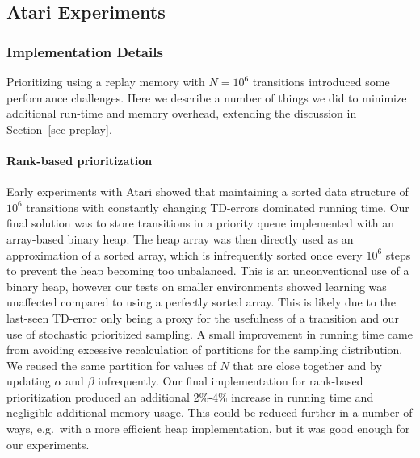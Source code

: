 \documentclass[a4paper]{article}
\begin{document}
\subsection{Atari Experiments}
\label{app-atari-experiments}


\subsubsection{Implementation Details}
\label{app-atari-experiments-impl-details}

Prioritizing using a replay memory with $N=10^6$ transitions introduced some performance challenges.  Here we describe a number of things we did to minimize additional run-time and memory overhead, extending the discussion in Section~\ref{sec-preplay}.

\paragraph{Rank-based prioritization} Early experiments with Atari showed that maintaining a sorted data structure of $10^6$ transitions with constantly changing TD-errors dominated running time.  Our final solution  was to store transitions in a priority queue implemented with an array-based binary heap.  The heap array was then directly used as an approximation of a sorted array, which is infrequently sorted once every $10^6$ steps to prevent the heap becoming too unbalanced.  This is an unconventional use of a binary heap, however our tests on smaller environments showed learning was unaffected compared to using a perfectly sorted array.  This is likely due to the last-seen TD-error only being a proxy for the usefulness of a transition and our use of stochastic prioritized sampling.  A small improvement in running time came from avoiding excessive recalculation of partitions for the sampling distribution.  We reused the same partition for values of $N$ that are close together and by updating $\alpha$ and $\beta$ infrequently.  Our final implementation for rank-based prioritization produced an additional 2\%-4\% increase in running time and negligible additional memory usage.  This could be reduced further in a number of ways, e.g.\ with a more efficient heap implementation, but it was good enough for our experiments.
\end{document}
